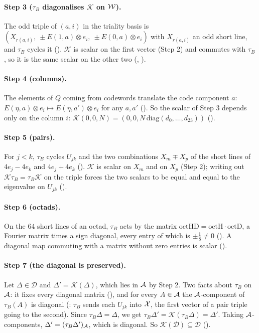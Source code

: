 \paragraph{Step 3 ($\tau_B$ diagonalises $\mathcal K$ on $\mathcal{W}$).}  The odd triple of $(a,i)$ in the triality basis is
$(X_{r(a,i)},\ \pm E(1,a)\otimes e_i,\ \pm E(0,a)\otimes e_i)$ with $X_{r(a,i)}$ an odd short line, and $\tau_B$ cycles it
().  $\mathcal K$ is scalar on the first vector (Step 2) and commutes with $\tau_B$, so it is the same scalar on the
other two (, ).

\paragraph{Step 4 (columns).}  The elements of $Q$ coming from codewords translate the code component $a$:
$E(\eta,a)\otimes e_i\mapsto E(\eta,a')\otimes e_i$ for any $a,a'$ ().  So the scalar of Step 3
depends only on the column $i$: $\mathcal K(0,0,N)=(0,0,N\,\mathrm{diag}(d_0,\dots,d_{23}))$ ().

\paragraph{Step 5 (pairs).}  For $j<k$, $\tau_B$ cycles $U_{jk}$ and the two combinations $X_m\mp X_p$ of the short lines of
$4e_j-4e_k$ and $4e_j+4e_k$ ().  $\mathcal K$ is scalar on $X_m$ and on $X_p$ (Step 2); writing out
$\mathcal K\tau_B=\tau_B\mathcal K$ on the triple forces the two scalars to be equal and equal to the eigenvalue on $U_{jk}$
().

\paragraph{Step 6 (octads).}  On the $64$ short lines of an octad, $\tau_B$ acts by the matrix
$\mathrm{octHD}=\mathrm{octH}\cdot\mathrm{octD}$, a Fourier matrix times a sign diagonal, every entry of which is $\pm\frac18\ne0$
().  A diagonal map commuting with a matrix without zero entries is scalar
().

\paragraph{Step 7 (the diagonal is preserved).}  Let $\Delta\in\mathcal D$ and $\Delta'=\mathcal K(\Delta)$, which lies in
$\mathcal{A}$ by Step 2.  Two facts about $\tau_B$ on $\mathcal{A}$: it fixes every diagonal matrix
(), and for every $A\in\mathcal{A}$ the $\mathcal{A}$-component of $\tau_B(A)$ is diagonal
(: $\tau_B$ sends each $U_{jk}$ into $\mathcal{X}$, the first vector of a pair triple going to the
second).  Since $\tau_B\Delta=\Delta$, we get $\tau_B\Delta'=\mathcal K(\tau_B\Delta)=\Delta'$.  Taking $\mathcal{A}$-components,
$\Delta'=(\tau_B\Delta')_{\mathcal{A}}$, which is diagonal.  So $\mathcal K(\mathcal D)\subseteq\mathcal D$
().

